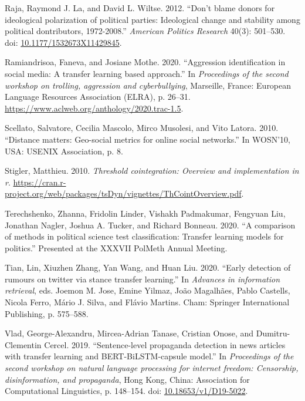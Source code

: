 \documentclass[12pt,]{article}
\newlength{\cslhangindent}
\newenvironment{CSLReferences}%
    {\setlength{\parindent}{0pt}%
    \everypar{\setlength{\hangindent}{\cslhangindent}}\ignorespaces}%
    {\par}
\begin{document}
\begin{CSLReferences}{1}{0}
\leavevmode{}%
Raja, Raymond J. La, and David L. Wiltse. 2012. {``Don't blame donors
for ideological polarization of political parties: Ideological change
and stability among political dontributors, 1972-2008.''} \emph{American
Politics Research} 40(3): 501--530. doi:
\href{https://doi.org/10.1177/1532673X11429845}{10.1177/1532673X11429845}.

\leavevmode{}%
Ramiandrisoa, Faneva, and Josiane Mothe. 2020. {``Aggression
identification in social media: A transfer learning based approach.''}
In \emph{Proceedings of the second workshop on trolling, aggression and
cyberbullying}, Marseille, France: European Language Resources
Association (ELRA), p. 26--31.
\url{https://www.aclweb.org/anthology/2020.trac-1.5}.

\leavevmode{}%
Scellato, Salvatore, Cecilia Mascolo, Mirco Musolesi, and Vito Latora.
2010. {``Distance matters: Geo-social metrics for online social
networks.''} In WOSN'10, USA: USENIX Association, p. 8.

\leavevmode{}%
Stigler, Matthieu. 2010. \emph{Threshold cointegration: Overview and
implementation in r}.
\url{https://cran.r-project.org/web/packages/tsDyn/vignettes/ThCointOverview.pdf}.

\leavevmode{}%
Terechshenko, Zhanna, Fridolin Linder, Vishakh Padmakumar, Fengyuan Liu,
Jonathan Nagler, Joshua A. Tucker, and Richard Bonneau. 2020. {``A
comparison of methods in political science test classification: Transfer
learning models for politics.''} Presented at the XXXVII PolMeth Annual
Meeting.

\leavevmode{}%
Tian, Lin, Xiuzhen Zhang, Yan Wang, and Huan Liu. 2020. {``Early
detection of rumours on twitter via stance transfer learning.''} In
\emph{Advances in information retrieval}, eds. Joemon M. Jose, Emine
Yilmaz, João Magalhães, Pablo Castells, Nicola Ferro, Mário J. Silva,
and Flávio Martins. Cham: Springer International Publishing, p.
575--588.

\leavevmode{}%
Vlad, George-Alexandru, Mircea-Adrian Tanase, Cristian Onose, and
Dumitru-Clementin Cercel. 2019. {``Sentence-level propaganda detection
in news articles with transfer learning and {BERT}-{B}i{LSTM}-capsule
model.''} In \emph{Proceedings of the second workshop on natural
language processing for internet freedom: Censorship, disinformation,
and propaganda}, Hong Kong, China: Association for Computational
Linguistics, p. 148--154. doi:
\href{https://doi.org/10.18653/v1/D19-5022}{10.18653/v1/D19-5022}.


\end{CSLReferences}
\end{document}
